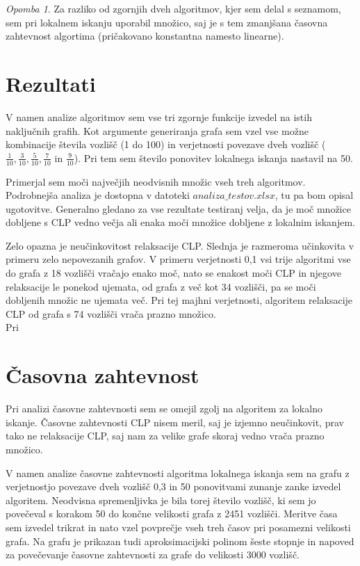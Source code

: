 \documentclass[a4paper, 12 pt]{article}
\theoremstyle{definition}
\theoremstyle{plain}
\theoremstyle{remark}
\newtheorem*{opomba}{Opomba}
\begin{document}
\begin{opomba}
Za razliko od zgornjih dveh algoritmov, kjer sem delal s seznamom, sem pri lokalnem iskanju uporabil množico, saj je s tem zmanjšana časovna zahtevnost algortima (pričakovano konstantna namesto linearne).
\end{opomba}

\section{Rezultati} %
V namen analize algoritmov sem vse tri zgornje funkcije izvedel na istih naključnih grafih. Kot argumente generiranja grafa sem vzel vse možne kombinacije števila vozlišč (1 do 100) in verjetnosti povezave dveh vozlišč ($\frac{1}{10}, \frac{3}{10}, \frac{5}{10}, \frac{7}{10}$ in $\frac{9}{10}$). Pri tem sem število ponovitev lokalnega iskanja nastavil na 50.

Primerjal sem moči največjih neodvisnih množic vseh treh algoritmov. Podrobnejša analiza je dostopna v datoteki $\textit{analiza\_testov.xlsx}$, tu pa bom opisal ugotovitve.  Generalno gledano za vse rezultate testiranj velja, da je moč množice dobljene s CLP vedno večja ali enaka moči množice dobljene z lokalnim iskanjem.

Zelo opazna je neučinkovitost relaksacije CLP. Slednja je razmeroma učinkovita v primeru zelo nepovezanih grafov. V primeru verjetnosti 0,1 vsi trije algoritmi vse do grafa z 18 vozlišči vračajo enako moč, nato se enakost moči CLP in njegove relaksacije le ponekod ujemata, od grafa z več kot 34 vozlišči, pa se moči dobljenih množic ne ujemata več. Pri tej majhni verjetnosti, algoritem relaksacije CLP od grafa s 74 vozlišči vrača prazno množico.\\
Pri %





\section{Časovna zahtevnost} %
Pri analizi časovne zahtevnosti sem se omejil zgolj na algoritem za lokalno iskanje. Časovne zahtevnosti CLP nisem meril, saj je izjemno neučinkovit,  prav tako ne relaksacije CLP, saj nam za velike grafe skoraj vedno vrača prazno množico.

V namen analize časovne zahtevnosti algoritma lokalnega iskanja sem na grafu z verjetnostjo povezave dveh vozlišč 0,3 in 50 ponovitvami zunanje zanke izvedel algoritem. Neodvisna spremenljivka je bila torej število vozlišč, ki sem jo povečeval s korakom 50 do končne velikosti grafa z 2451 vozlišči. Meritve časa sem izvedel trikrat in nato vzel povprečje vseh treh časov pri posamezni velikosti grafa. Na grafu je prikazan tudi aproksimacijski polinom šeste stopnje in napoved za povečevanje časovne zahtevnosti za grafe do velikosti 3000 vozlišč.
\end{document}
